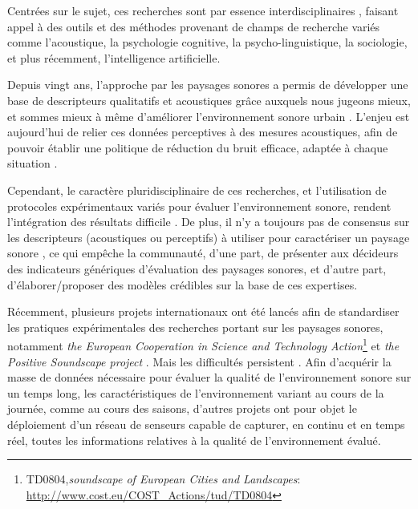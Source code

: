 Centrées sur le sujet, ces recherches sont par essence interdisciplinaires \citep{davies2013perception,aletta2016soundscape}, faisant appel à des outils et des méthodes provenant de champs de recherche variés comme l'acoustique, la psychologie cognitive, la psycho-linguistique, la sociologie, et plus récemment, l’intelligence artificielle.

Depuis vingt ans, l'approche par les paysages sonores a permis de développer une base de descripteurs qualitatifs et acoustiques grâce auxquels nous jugeons mieux, et sommes mieux à même d'améliorer l'environnement sonore urbain \citep{kang2006urban,schulte2007soundscape}. L'enjeu est aujourd'hui de relier ces données perceptives à des mesures acoustiques, afin de pouvoir établir une politique de réduction du bruit efficace, adaptée à chaque situation \citep{schulte2013soundscape}.

Cependant, le caractère pluridisciplinaire de ces recherches, et l'utilisation de protocoles expérimentaux variés pour évaluer l'environnement sonore, rendent l’intégration des résultats difficile \citep{davies2013perception}. De plus, il n'y a toujours pas de consensus sur les descripteurs (acoustiques ou perceptifs) à utiliser pour caractériser un paysage sonore \citep{brocolini2012prediction,aletta2016soundscape}, ce qui empêche la communauté, d'une part, de présenter aux décideurs des indicateurs génériques d'évaluation des paysages sonores, et d'autre part, d'élaborer/proposer des modèles crédibles sur la base de ces expertises.

Récemment, plusieurs projets internationaux ont été lancés afin de standardiser les pratiques expérimentales des recherches portant sur les paysages sonores, notamment \emph{the European Cooperation in Science and Technology Action}\footnote{TD0804,\emph{soundscape of European Cities and Landscapes}: \url{http://www.cost.eu/COST_Actions/tud/TD0804}} \citep{schulte2010soundscape} et \emph{the Positive Soundscape project} \citep{salford2106,davies2013perception}. Mais les difficultés persistent \citep{schulte2013soundscape,ribeiro2013heart}. Afin d'acquérir la masse de données nécessaire pour évaluer la qualité de l'environnement sonore sur un temps long, les caractéristiques de l'environnement variant au cours de la journée, comme au cours des saisons, d'autres projets \citep{park14} ont pour objet le déploiement d'un réseau de senseurs capable de capturer, en continu et en temps réel, toutes les informations relatives à la qualité de l’environnement évalué.

